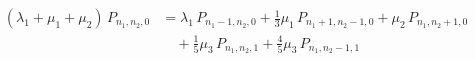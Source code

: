 \[
\begin{aligned}
  (\lambda_{1} + \mu_{1} + \mu_{2})\,P_{n_{1},n_{2},0} &= \lambda_{1}\,P_{n_{1}-1,n_{2},0} + \tfrac{1}{3}\mu_{1}\,P_{n_{1}+1,n_{2}-1,0} + \mu_{2}\,P_{n_{1},n_{2}+1,0}\\
  &\quad + \tfrac{1}{5}\mu_{3}\,P_{n_{1},n_{2},1} + \tfrac{4}{5}\mu_{3}\,P_{n_{1},n_{2}-1,1}
\end{aligned}
\]
